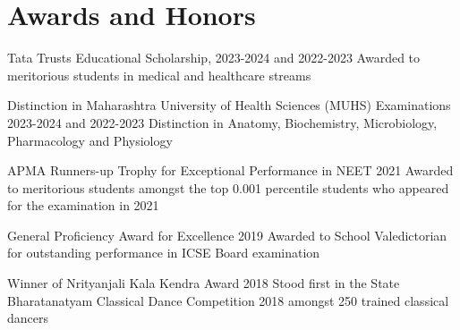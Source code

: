 \section{Awards and Honors}
\resumeSubHeadingListStart

\resumeAward
{Tata Trusts Educational Scholarship, 2023-2024 and 2022-2023}
{Awarded to meritorious students in medical and healthcare streams}

\resumeAward
{Distinction in Maharashtra University of Health Sciences (MUHS) Examinations 2023-2024 and 2022-2023}
{Distinction in Anatomy, Biochemistry, Microbiology, Pharmacology and Physiology}

\resumeAward
{APMA Runners-up Trophy for Exceptional Performance in NEET 2021}
{Awarded to meritorious students amongst the top 0.001 percentile students who appeared for the examination in 2021}

\resumeAward
{General Proficiency Award for Excellence 2019}
{Awarded to School Valedictorian for outstanding performance in ICSE Board examination}

\resumeAward
{Winner of Nrityanjali Kala Kendra Award 2018}
{Stood first in the State Bharatanatyam Classical Dance Competition 2018 amongst 250 trained classical dancers}

\resumeSubHeadingListEnd
